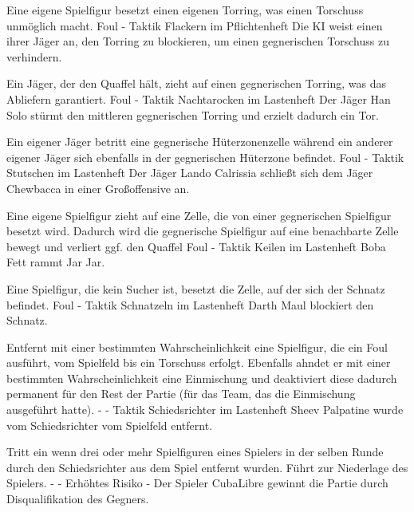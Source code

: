 {Eine eigene Spielfigur besetzt einen eigenen Torring, was einen Torschuss unmöglich macht.}
{Foul}
{-}
{Taktik}
{\glqq{}Flackern\grqq{}  im Pflichtenheft}
{Die KI weist einen ihrer Jäger an, den Torring zu blockieren, um einen gegnerischen Torschuss zu verhindern.}

{Ein Jäger, der den Quaffel hält, zieht auf einen gegnerischen Torring, was das Abliefern garantiert.}
{Foul}
{-}
{Taktik}
{\glqq{}Nachtarocken\grqq{}  im Lastenheft}
{Der Jäger \glqq{}Han Solo\grqq{} stürmt den mittleren gegnerischen Torring und erzielt dadurch ein Tor.}

{Ein eigener Jäger betritt eine gegnerische Hüterzonenzelle während ein anderer eigener Jäger sich ebenfalls in der gegnerischen Hüterzone befindet.}
{Foul}
{-}
{Taktik}
{\glqq{}Stutschen\grqq{}  im Lastenheft}
{Der Jäger \glqq{}Lando Calrissia\grqq{} schließt sich dem Jäger \glqq{}Chewbacca\grqq{} in einer Großoffensive an.}

{Eine eigene Spielfigur zieht auf eine Zelle, die von einer gegnerischen Spielfigur besetzt wird. Dadurch wird die gegnerische Spielfigur auf eine benachbarte Zelle bewegt und verliert ggf. den Quaffel}
{Foul}
{-}
{Taktik}
{\glqq{}Keilen\grqq{}  im Lastenheft}
{\glqq{}Boba Fett\grqq{} rammt \glqq{}Jar Jar\grqq{}.}

{Eine Spielfigur, die kein Sucher ist, besetzt die Zelle, auf der sich der Schnatz befindet.}
{Foul}
{-}
{Taktik}
{\glqq{}Schnatzeln\grqq{}  im Lastenheft}
{\glqq{}Darth Maul\grqq{} blockiert den Schnatz.}

{Entfernt mit einer bestimmten Wahrscheinlichkeit eine Spielfigur, die ein Foul ausführt, vom Spielfeld bis ein Torschuss erfolgt. Ebenfalls ahndet er mit einer bestimmten Wahrscheinlichkeit eine Einmischung  und deaktiviert diese dadurch permanent für den Rest der Partie (für das Team, das die Einmischung ausgeführt hatte).}
{-}
{-}
{Taktik}
{\glqq{}Schiedsrichter\grqq{}  im Lastenheft}
{\glqq{}Sheev Palpatine\grqq{} wurde vom Schiedsrichter vom Spielfeld entfernt.}

{Tritt ein wenn drei oder mehr Spielfiguren eines Spielers in der selben Runde durch den Schiedsrichter aus dem Spiel entfernt wurden. Führt zur Niederlage des Spielers.}
{-}
{-}
{Erhöhtes Risiko}
{-}
{Der Spieler \glqq{}CubaLibre\grqq{} gewinnt die Partie durch Disqualifikation des Gegners.}
